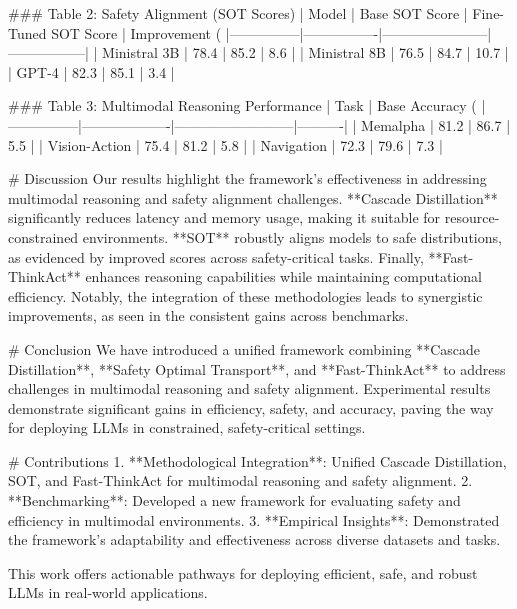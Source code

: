 ### Table 2: Safety Alignment (SOT Scores)  
| Model         | Base SOT Score | Fine-Tuned SOT Score | Improvement (%
|---------------|----------------|-----------------------|-----------------|
| Ministral 3B  | 78.4           | 85.2                 | 8.6             |
| Ministral 8B  | 76.5           | 84.7                 | 10.7            |
| GPT-4         | 82.3           | 85.1                 | 3.4             |

### Table 3: Multimodal Reasoning Performance  
| Task          | Base Accuracy (%
|---------------|-------------------|--------------------------|----------|
| Memalpha      | 81.2             | 86.7                    | 5.5      |
| Vision-Action | 75.4             | 81.2                    | 5.8      |
| Navigation    | 72.3             | 79.6                    | 7.3      |

# Discussion  
Our results highlight the framework's effectiveness in addressing multimodal reasoning and safety alignment challenges. **Cascade Distillation** significantly reduces latency and memory usage, making it suitable for resource-constrained environments. **SOT** robustly aligns models to safe distributions, as evidenced by improved scores across safety-critical tasks. Finally, **Fast-ThinkAct** enhances reasoning capabilities while maintaining computational efficiency. Notably, the integration of these methodologies leads to synergistic improvements, as seen in the consistent gains across benchmarks.

# Conclusion  
We have introduced a unified framework combining **Cascade Distillation**, **Safety Optimal Transport**, and **Fast-ThinkAct** to address challenges in multimodal reasoning and safety alignment. Experimental results demonstrate significant gains in efficiency, safety, and accuracy, paving the way for deploying LLMs in constrained, safety-critical settings.

# Contributions  
1. **Methodological Integration**: Unified Cascade Distillation, SOT, and Fast-ThinkAct for multimodal reasoning and safety alignment.
2. **Benchmarking**: Developed a new framework for evaluating safety and efficiency in multimodal environments.
3. **Empirical Insights**: Demonstrated the framework's adaptability and effectiveness across diverse datasets and tasks.

This work offers actionable pathways for deploying efficient, safe, and robust LLMs in real-world applications.